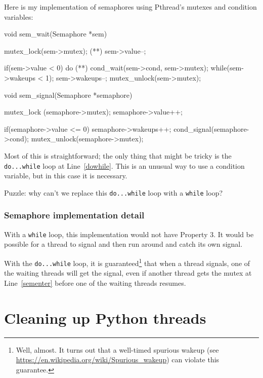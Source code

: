 \documentclass{book}
\begin{document}
Here is my implementation of semaphores using Pthread's mutexes
and condition variables:


\begin{unbreakable}[]{}
void sem_wait(Semaphore *sem) {
 mutex_lock(sem->mutex);                 (*\label{sementer}*)
 sem->value--;

 if(sem->value < 0) {
  do {                                                (*\label{dowhile}*)
   cond_wait(sem->cond, sem->mutex);
  } while(sem->wakeups < 1);
   sem->wakeups--;
  }
 mutex_unlock(sem->mutex);
}

void sem_signal(Semaphore *semaphore) {
 mutex_lock (semaphore->mutex);
 semaphore->value++;

 if(semaphore->value <= 0) {
  semaphore->wakeups++;
  cond_signal(semaphore->cond);
 }
 mutex_unlock(semaphore->mutex);
}
\end{unbreakable}

Most of this is straightforward; the only thing that might be
tricky is the {\tt do...while} loop at Line~\ref{dowhile}.
This is an unusual way to use a condition variable, but in
this case it is necessary.

Puzzle: why can't we replace this {\tt do...while} loop
with a {\tt while} loop?


\subsection{Semaphore implementation detail}

With a {\tt while} loop, this implementation would not have
Property 3.  It would be possible for a thread to signal
and then run around and catch its own signal.

With the {\tt do...while} loop, it is guaranteed\footnote{Well,
    almost.  It turns out that a well-timed spurious wakeup (see
    \url{https://en.wikipedia.org/wiki/Spurious_wakeup}) can violate this
    guarantee.} that when a thread signals, one of the waiting threads
will get the signal, even if another thread gets the mutex at
Line~\ref{sementer} before one of the waiting threads resumes.





\appendix

\chapter{Cleaning up Python threads}
\label{cleanup}
\end{document}
